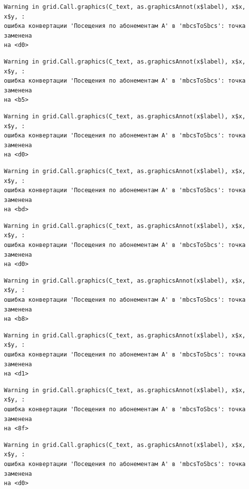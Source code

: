 \documentclass[
  letterpaper,
  DIV=11,
  numbers=noendperiod]{scrreprt}
\begin{document}
\begin{verbatim}
Warning in grid.Call.graphics(C_text, as.graphicsAnnot(x$label), x$x, x$y, :
ошибка конвертации 'Посещения по абонементам А' в 'mbcsToSbcs': точка заменена
на <d0>
\end{verbatim}

\begin{verbatim}
Warning in grid.Call.graphics(C_text, as.graphicsAnnot(x$label), x$x, x$y, :
ошибка конвертации 'Посещения по абонементам А' в 'mbcsToSbcs': точка заменена
на <b5>
\end{verbatim}

\begin{verbatim}
Warning in grid.Call.graphics(C_text, as.graphicsAnnot(x$label), x$x, x$y, :
ошибка конвертации 'Посещения по абонементам А' в 'mbcsToSbcs': точка заменена
на <d0>
\end{verbatim}

\begin{verbatim}
Warning in grid.Call.graphics(C_text, as.graphicsAnnot(x$label), x$x, x$y, :
ошибка конвертации 'Посещения по абонементам А' в 'mbcsToSbcs': точка заменена
на <bd>
\end{verbatim}

\begin{verbatim}
Warning in grid.Call.graphics(C_text, as.graphicsAnnot(x$label), x$x, x$y, :
ошибка конвертации 'Посещения по абонементам А' в 'mbcsToSbcs': точка заменена
на <d0>
\end{verbatim}

\begin{verbatim}
Warning in grid.Call.graphics(C_text, as.graphicsAnnot(x$label), x$x, x$y, :
ошибка конвертации 'Посещения по абонементам А' в 'mbcsToSbcs': точка заменена
на <b8>
\end{verbatim}

\begin{verbatim}
Warning in grid.Call.graphics(C_text, as.graphicsAnnot(x$label), x$x, x$y, :
ошибка конвертации 'Посещения по абонементам А' в 'mbcsToSbcs': точка заменена
на <d1>
\end{verbatim}

\begin{verbatim}
Warning in grid.Call.graphics(C_text, as.graphicsAnnot(x$label), x$x, x$y, :
ошибка конвертации 'Посещения по абонементам А' в 'mbcsToSbcs': точка заменена
на <8f>
\end{verbatim}

\begin{verbatim}
Warning in grid.Call.graphics(C_text, as.graphicsAnnot(x$label), x$x, x$y, :
ошибка конвертации 'Посещения по абонементам А' в 'mbcsToSbcs': точка заменена
на <d0>
\end{verbatim}
\end{document}
